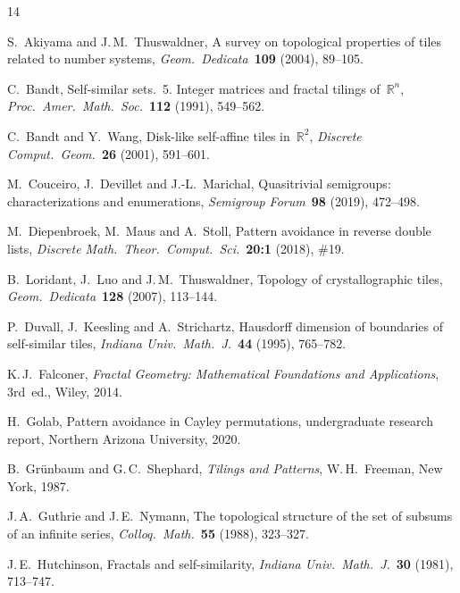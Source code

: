 \documentclass{amsart}
\theoremstyle{definition}
\theoremstyle{remark}
\newcommand{\R}{\mathbb{R}}
\begin{document}
\begin{thebibliography}{14}

S.~Akiyama and J.\,M.~Thuswaldner,
A survey on topological properties of tiles related to number systems,
\emph{Geom.\ Dedicata}\ \textbf{109} (2004), 89--105.

C.~Bandt,
Self-similar sets.~5. Integer matrices and fractal tilings of~$\R^n$,
\emph{Proc.\ Amer.\ Math.\ Soc.}\ \textbf{112} (1991), 549--562.

C.~Bandt and Y.~Wang,
Disk-like self-affine tiles in~$\R^2$,
\emph{Discrete Comput.\ Geom.}\ \textbf{26} (2001), 591--601.

M.~Couceiro, J.~Devillet and J.-L.~Marichal,
Quasitrivial semigroups: characterizations and enumerations,
\emph{Semigroup Forum}\ \textbf{98} (2019), 472--498.

M.~Diepenbroek, M.~Maus and A.~Stoll,
Pattern avoidance in reverse double lists,
\emph{Discrete Math.\ Theor.\ Comput.\ Sci.}\ \textbf{20:1}
(2018), \#19.

B.~Loridant, J.~Luo and J.\,M.~Thuswaldner,
Topology of crystallographic tiles,
\emph{Geom.\ Dedicata}\ \textbf{128} (2007), 113--144.

P.~Duvall, J.~Keesling and A.~Strichartz,
Hausdorff dimension of boundaries of self-similar tiles,
\emph{Indiana Univ.\ Math.\ J.}\ \textbf{44} (1995), 765--782.

K.\,J.~Falconer,
\emph{Fractal Geometry: Mathematical Foundations and Applications}, 3rd~ed.,
Wiley, 2014.

H.~Golab,
Pattern avoidance in Cayley permutations,
undergraduate research report, Northern Arizona University,
2020.

B.~Gr{\"u}nbaum and G.\,C.~Shephard,
\emph{Tilings and Patterns},
W.\,H.~Freeman, New York, 1987.

J.\,A.~Guthrie and J.\,E.~Nymann,
The topological structure of the set of subsums of an infinite
series,
\emph{Colloq.\ Math.}\ \textbf{55} (1988), 323--327.

J.\,E.~Hutchinson,
Fractals and self-similarity,
\emph{Indiana Univ.\ Math.\ J.}\ \textbf{30} (1981), 713--747.


\end{thebibliography}
\end{document}
